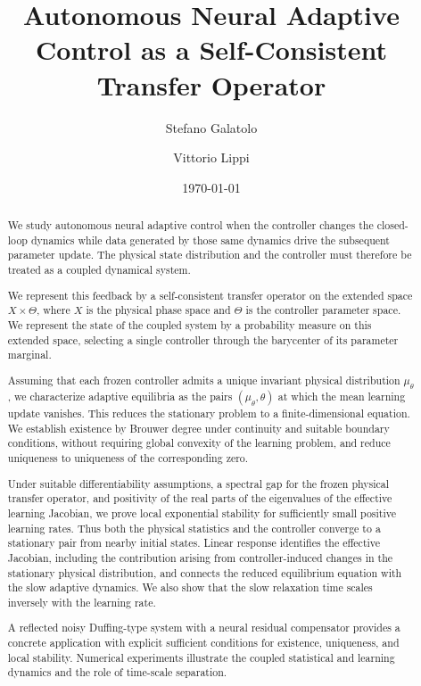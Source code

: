 \documentclass[11pt]{article}
\title{Autonomous Neural Adaptive Control as a Self-Consistent Transfer Operator}
\author{Stefano Galatolo \and Vittorio Lippi}
\date{\today}
\theoremstyle{definition}
\theoremstyle{remark}
\begin{document}
\maketitle


\begin{abstract}
We study autonomous neural adaptive control when the controller changes the closed-loop dynamics while data generated by those same dynamics drive the subsequent parameter update. The physical state distribution and the controller must therefore be treated as a coupled dynamical system.

We represent this feedback by a self-consistent transfer operator on the extended space \(X\times\Theta\), where \(X\) is the physical phase space and \(\Theta\) is the controller parameter space.  We represent the state of the coupled system by a probability measure on this extended space, selecting a single controller through the barycenter of its parameter marginal.

Assuming that each frozen controller admits a unique invariant physical distribution \(\mu_\theta\), we characterize adaptive equilibria as the pairs \((\mu_\theta,\theta)\) at which the mean learning update vanishes. This reduces the stationary problem to a finite-dimensional equation. We establish existence by Brouwer degree under continuity and suitable boundary conditions, without requiring global convexity of the learning problem, and reduce uniqueness to uniqueness of the corresponding zero.

Under suitable differentiability assumptions, a spectral gap for the frozen physical transfer operator, and positivity of the real parts of the eigenvalues of the effective learning Jacobian, we prove local exponential stability for sufficiently small positive learning rates. Thus both the physical statistics and the controller converge to a stationary pair from nearby initial states. Linear response identifies the effective Jacobian, including the contribution arising from controller-induced changes in the stationary physical distribution, and connects the reduced equilibrium equation with the slow adaptive dynamics. We also show that the slow relaxation time scales inversely with the learning rate.

A reflected noisy Duffing-type system with a neural residual compensator provides a concrete application with explicit sufficient conditions for existence, uniqueness, and local stability. Numerical experiments illustrate the coupled statistical and learning dynamics and the role of time-scale separation.
\end{abstract}
\end{document}
